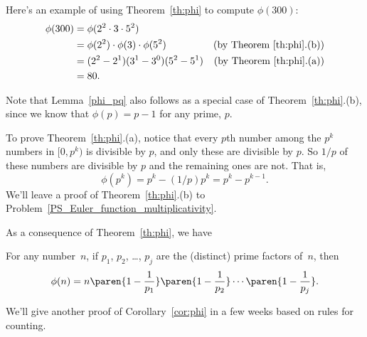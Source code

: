Here's an example of using Theorem~\ref{th:phi} to compute $\phi(300)$:
\begin{align*}
\phi(300) & = \phi(2^2 \cdot 3 \cdot 5^2)\\
& = \phi(2^2) \cdot \phi(3) \cdot \phi(5^2) &
\text{(by Theorem~\ref{th:phi}.(b))}\\
& = (2^2 - 2^1) (3^1 - 3^0) (5^2 - 5^1) & \text{(by
  Theorem~\ref{th:phi}.(a))}\\
& = 80.
\end{align*}

Note that Lemma~\ref{phi_pq} also follows as a special case of
Theorem~\ref{th:phi}.(b), since we know that $\phi(p) = p-1$ for any
prime, $p$.

To prove Theorem~\ref{th:phi}.(a), notice that every $p$th number among the $p^k$ numbers
in $[0, p^{k})$ is divisible by $p$, and only these are divisible by $p$.  So $1/p$ of
  these numbers are divisible by $p$ and the remaining ones are not.  That is,
\[
\phi(p^{k}) = p^k - (1/p)p^k = p^k -p^{k-1}.
\]
We'll leave a proof of Theorem~\ref{th:phi}.(b) to
Problem~\ref{PS_Euler_function_multiplicativity}.

As a consequence of Theorem~\ref{th:phi}, we have
\begin{corollary}\label{cor:phi}
For any number~$n$, if $p_1$, $p_2$, \dots, $p_j$ are the (distinct) prime factors of~$n$,
then
\begin{equation*}
    \phi(n) = n \paren{1 - \frac{1}{p_1}} \paren{1 - \frac{1}{p_2}} \cdots \paren{1 -
      \frac{1}{p_j}}.
 \end{equation*}
\end{corollary}
We'll give another proof of Corollary~\ref{cor:phi} in a few weeks based on rules for
counting.

\iffalse are all those of the form $mp$.  For $mp$ to be in the interval, $m$ can take any
value from 0 to $p^{k-1}-1$ and no others, so there are exactly $p^{k-1}$ numbers in the
interval that are divisible by $p$.  Now $\phi(p^{k})$ equals the number of remaining
elements in the interval, namely, $p^k -p^{k-1}$.  \fi


